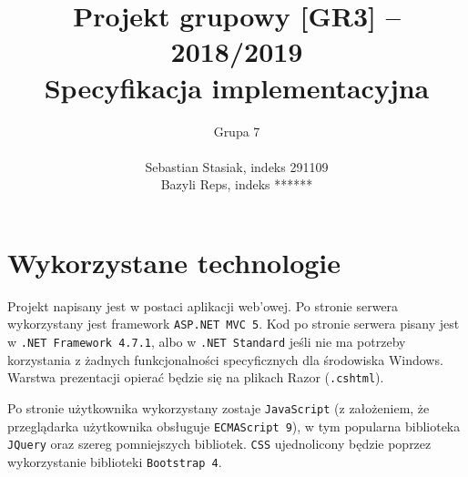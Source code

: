 \documentclass[a4paper, 10pt, titlepage]{article}
\title {Projekt grupowy [GR3] -- 2018/2019\\Specyfikacja implementacyjna}
\author{Grupa 7 \\\\ Sebastian Stasiak, indeks 291109 \\ Bazyli Reps, indeks ******}
\newcommand{\code}[1]{\texttt{#1}}
\begin{document}
\maketitle
\tableofcontents
\newpage

\section{Wykorzystane technologie}

Projekt napisany jest w postaci aplikacji web'owej.
Po stronie serwera wykorzystany jest framework \code{ASP.NET MVC 5}. Kod po stronie serwera pisany jest w \code{.NET Framework 4.7.1}, albo w \code{.NET Standard} jeśli nie ma potrzeby korzystania z żadnych funkcjonalności specyficznych dla środowiska Windows.
Warstwa prezentacji opierać będzie się na plikach Razor (\code{.cshtml}).

Po stronie użytkownika wykorzystany zostaje \code{JavaScript} (z założeniem, że przeglądarka użytkownika obsługuje \code{ECMAScript 9}), w tym popularna biblioteka \code{JQuery} oraz szereg pomniejszych bibliotek.
\code{CSS} ujednolicony będzie poprzez wykorzystanie biblioteki \code{Bootstrap 4}.
\end{document}
